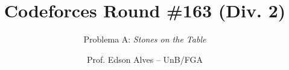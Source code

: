 \title{Codeforces Round \#163 (Div. 2)}
\subtitle{Problema A: \it Stones on  the Table}
\author{Prof. Edson Alves -- UnB/FGA}
\date{}
